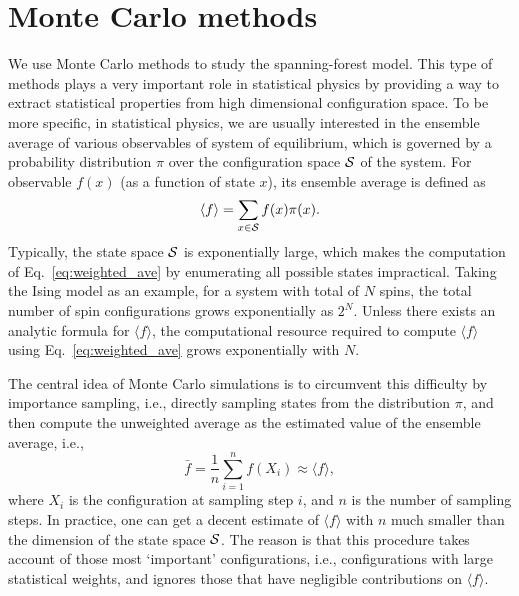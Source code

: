 \section{Monte Carlo methods}
We use Monte Carlo methods to study the spanning-forest model. This type of methods plays a very important role in statistical physics by
providing a way to extract statistical properties from high dimensional configuration space. To be more specific, in statistical
physics, we are usually interested in the ensemble average of various observables of system of equilibrium, which is governed by a probability distribution $\pi$ over the configuration space ${\mathcal S}$ of the system. 
For observable $f(x)$ (as a function of state $x$), its ensemble average is defined as
\begin{equation}\label{eq:weighted_ave}
	\langle f \rangle = \sum_{x \in {\mathcal S}} f(x) \pi(x).
\end{equation}
Typically, the state space ${\mathcal S}$ is exponentially large, which makes the computation of Eq.~\eqref{eq:weighted_ave} by enumerating all possible states impractical.
Taking the Ising model as an example, for a system with total of $N$ spins, the total number of spin configurations grows exponentially as $2^N$.
Unless there exists an analytic formula for $\langle f \rangle$, the computational resource required to compute $\langle f \rangle$ 
using Eq.~\eqref{eq:weighted_ave} grows exponentially with $N$.

The central idea of Monte Carlo simulations is to circumvent this difficulty by importance sampling, i.e., directly sampling states from the distribution
$\pi$, and then compute the unweighted average as the estimated value of the ensemble average, i.e.,
\begin{equation}
	\bar{f} = \frac{1}{n}\sum_{i=1}^n f(X_i) \approx \langle f \rangle,
\end{equation}
where $X_i$ is the configuration at sampling step $i$, and $n$ is the number of sampling steps. In practice, one can get a decent estimate of $\langle f \rangle $ with $n$ much smaller
than the dimension of the state space ${\mathcal S}$. The reason is that this procedure takes account of those most `important' configurations,
i.e., configurations with large statistical weights, and ignores those that have negligible contributions on $\langle f \rangle$.

